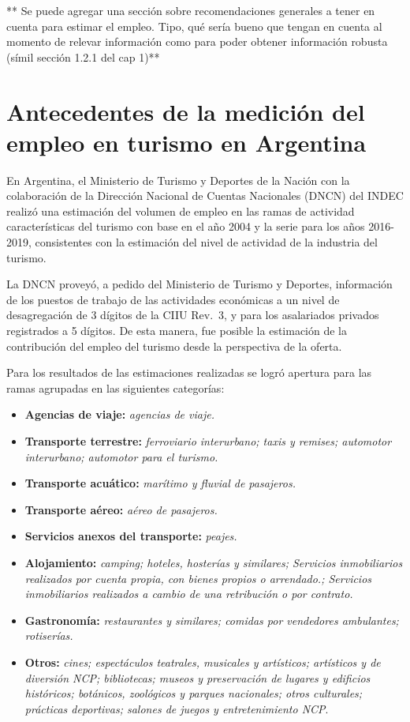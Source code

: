 \documentclass[
  openany]{book}
\providecommand{\tightlist}{%
  \setlength{\itemsep}{0pt}\setlength{\parskip}{0pt}}
\begin{document}
** Se puede agregar una sección sobre recomendaciones generales a tener en cuenta para estimar el empleo. Tipo, qué sería bueno que tengan en cuenta al momento de relevar información como para poder obtener información robusta (símil sección 1.2.1 del cap 1)**

\hypertarget{antecedentes-de-la-mediciuxf3n-del-empleo-en-turismo-en-argentina}{%
\section{Antecedentes de la medición del empleo en turismo en Argentina}\label{antecedentes-de-la-mediciuxf3n-del-empleo-en-turismo-en-argentina}}

En Argentina, el Ministerio de Turismo y Deportes de la Nación con la colaboración de la Dirección Nacional de Cuentas Nacionales (DNCN) del INDEC realizó una estimación del volumen de empleo en las ramas de actividad características del turismo con base en el año 2004 y la serie para los años 2016-2019, consistentes con la estimación del nivel de actividad de la industria del turismo.

La DNCN proveyó, a pedido del Ministerio de Turismo y Deportes, información de los puestos de trabajo de las actividades económicas a un nivel de desagregación de 3 dígitos de la CIIU Rev.~3, y para los asalariados privados registrados a 5 dígitos. De esta manera, fue posible la estimación de la contribución del empleo del turismo desde la perspectiva de la oferta.

Para los resultados de las estimaciones realizadas se logró apertura para las ramas agrupadas en las siguientes categorías:

\begin{itemize}
\tightlist
\item
  \textbf{Agencias de viaje:} \emph{agencias de viaje.}
\item
  \textbf{Transporte terrestre:} \emph{ferroviario interurbano; taxis y remises; automotor interurbano; automotor para el turismo.}
\item
  \textbf{Transporte acuático:} \emph{marítimo y fluvial de pasajeros.}
\item
  \textbf{Transporte aéreo:} \emph{aéreo de pasajeros.}
\item
  \textbf{Servicios anexos del transporte:} \emph{peajes.}
\item
  \textbf{Alojamiento:} \emph{camping; hoteles, hosterías y similares; Servicios inmobiliarios realizados por cuenta propia, con bienes propios o arrendado.; Servicios inmobiliarios realizados a cambio de una retribución o por contrato.}
\item
  \textbf{Gastronomía:} \emph{restaurantes y similares; comidas por vendedores ambulantes; rotiserías.}
\item
  \textbf{Otros:} \emph{cines; espectáculos teatrales, musicales y artísticos; artísticos y de diversión NCP; bibliotecas; museos y preservación de lugares y edificios históricos; botánicos, zoológicos y parques nacionales; otros culturales; prácticas deportivas; salones de juegos y entretenimiento NCP}.
\end{itemize}
\end{document}

